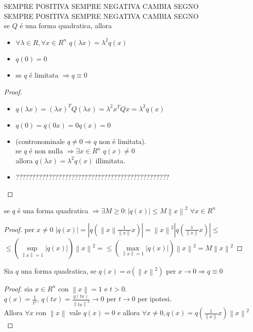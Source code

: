SEMPRE POSITIVA SEMPRE NEGATIVA CAMBIA SEGNO\\
SEMPRE POSITIVA SEMPRE NEGATIVA CAMBIA SEGNO\\
\proposition
se $Q$ \'e una forma quadratica, allora\\
\begin{itemize}
	\item $\forall\lambda\in R, \forall x\in R^n$ $q(\lambda x)=\lambda^2q(x)$
	\item $q(0)=0$
	\item se $q$ \'e limitata $\Rightarrow q\equiv 0$ 
\end{itemize}
\begin{proof}
	\begin{itemize}
		\item $q(\lambda x)=(\lambda x)^TQ(\lambda x)=\lambda^2x^TQx=\lambda^2q(x)$
		\item $q(0)=q(0x)=0q(x)=0$
		\item (contronominale $q\ne 0 \Rightarrow q$ non \'e limitata).\\
		se $q$ \'e non nulla $\Rightarrow \exists x \in R^n$ $q(x)\ne 0$\\
		allora $q(\lambda x)=\lambda^2q(x)$ illimitata.
		\item ???????????????????????????????????????????????
	\end{itemize}
\end{proof}
\proposition
se $q$ \'e una forma quadratica $\Rightarrow\exists M\ge 0: |q(x)|\le M\left\| x \right\|^2$ $\forall x\in R^n$
\begin{proof}
	per $x\ne 0$ $\left| q(x)\right| =\left| q\left(\left\| x\right\| \frac{1}{\left\| x\right\| }x\right) \right| = \left\|x\right\|^2\left|q\left(\frac{1}{\left\|x\right\|}x\right)\right|\le$\\
	$\le\left(\sup\limits_{\left\|x\right\|=1}\left|q(x)\right|\right)\left\|x\right\|^2=\le\left(\max\limits_{\left\|x\right\|=1}\left|q(x)\right|\right)\left\|x\right\|^2=M\left\|x\right\|^2$
\end{proof}
\proposition
Sia $q$ una forma quadratica, se $q(x)=o(\left\|x\right\|^2)$ per $x\rightarrow 0 \Rightarrow q\equiv 0$
\begin{proof}
	sia $x\in R^n$ con $\left\|x\right\|=1$ e $t>0$.\\
	$q(x)=\frac{1}{t^2}$, $q(tx)=\frac{q(tx)}{\left\|tx\right\|^2}\rightarrow 0$ per $t\rightarrow 0$ per ipotesi.\\
	Allora $\forall x$ con $\left\|x\right\|$ vale $q(x)=0$ e allora $\forall x\ne 0, q(x)=q\left(\frac{1}{\left\|x\right\|}x\right)\left\|x\right\|^2$
\end{proof}
